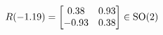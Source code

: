 \documentclass[preview]{standalone}
\begin{document}
\begin{align*}
\special{dvisvgm:raw <g id='unique000'>}R(-1.19) = \begin{bmatrix} 0.38 & 0.93 \\ -0.93 & 0.38 \end{bmatrix} \in \text{SO}(2)\special{dvisvgm:raw </g>}
\end{align*}
\end{document}
